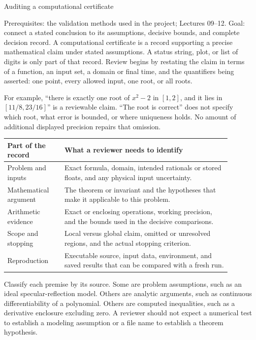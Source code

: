 \def\lecturenumber{13}


\opening{Auditing a computational certificate}{Prerequisites: the validation methods used in the project; Lectures 09--12.\newline
Goal: connect a stated conclusion to its assumptions, decisive bounds, and complete decision record.}
A computational certificate is a record supporting a precise mathematical
claim under stated assumptions. A status string, plot, or list of digits
is only part of that record. Review begins by restating the claim in terms
of a function, an input set, a domain or final time, and the quantifiers
being asserted: one point, every allowed input, one root, or all roots.

For example, ``there is exactly one root of $x^2-2$ in $[1,2]$, and it
lies in $[11/8,23/16]$'' is a reviewable claim. ``The root is correct''
does not specify which root, what error is bounded, or where uniqueness
holds. No amount of additional displayed precision repairs that omission.

\begin{center}
\begin{tabular}{p{0.23\linewidth}p{0.67\linewidth}}
\toprule
Part of the record & What a reviewer needs to identify\\
\midrule
Problem and inputs & Exact formula, domain, intended rationals or stored floats,
and any physical input uncertainty.\\[3pt]
Mathematical argument & The theorem or invariant and the hypotheses that make
it applicable to this problem.\\[3pt]
Arithmetic evidence & Exact or enclosing operations, working precision, and
the bounds used in the decisive comparisons.\\[3pt]
Scope and stopping & Local versus global claim, omitted or unresolved regions,
and the actual stopping criterion.\\[3pt]
Reproduction & Executable source, input data, environment, and saved results
that can be compared with a fresh run.\\
\bottomrule
\end{tabular}
\end{center}

Classify each premise by its source. Some are problem assumptions, such as
an ideal specular-reflection model. Others are analytic arguments, such as
continuous differentiability of a polynomial. Others are computed inequalities,
such as a derivative enclosure excluding zero. A reviewer should not expect
a numerical test to establish a modeling assumption or a file name to establish
a theorem hypothesis.

